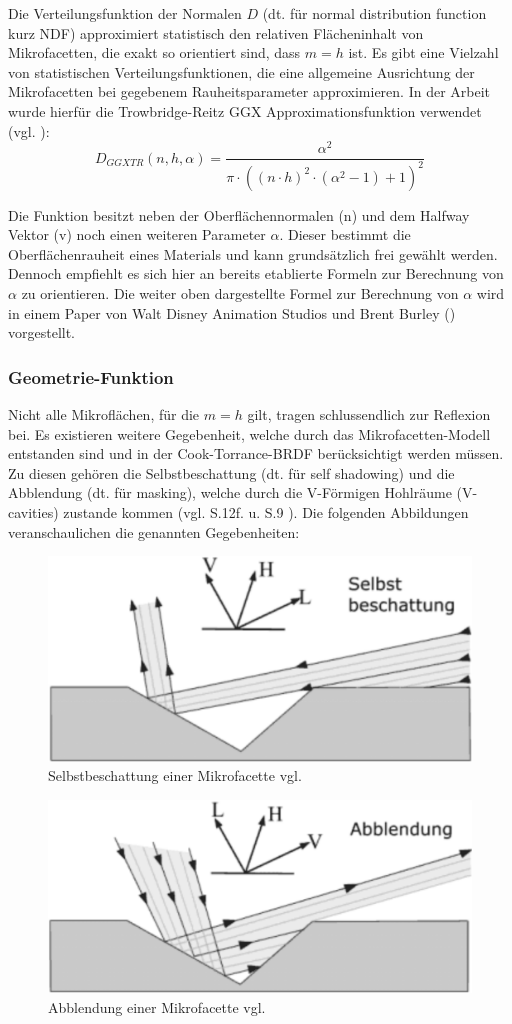 \documentclass[
  11pt,
  a4paper,
  oneside
  ]{article}
\begin{document}
Die Verteilungsfunktion der Normalen $D$ (dt. für normal distribution function kurz NDF) approximiert statistisch den relativen Flächeninhalt von Mikrofacetten, die exakt so orientiert sind, dass $m = h$ ist. Es gibt eine Vielzahl von statistischen Verteilungsfunktionen, die eine allgemeine Ausrichtung der Mikrofacetten bei gegebenem Rauheitsparameter approximieren. In der Arbeit wurde hierfür die Trowbridge-Reitz GGX Approximationsfunktion verwendet (vgl. \cite{learnOpenGL}):
\[D_{GGXTR}\left( n,h,\alpha \right) =\dfrac{\alpha ^{2}}{\pi \cdot \left( \left( n\cdot h\right) ^{2}\cdot \left( \alpha ^{2}-1\right) +1\right) ^{2}}\]

Die Funktion besitzt neben der Oberflächennormalen (n) und dem Halfway Vektor (v) noch einen weiteren Parameter $\alpha$. Dieser bestimmt die Oberflächenrauheit eines Materials und kann grundsätzlich frei gewählt werden. Dennoch empfiehlt es sich hier an bereits etablierte Formeln zur Berechnung von $\alpha$ zu orientieren. Die weiter oben dargestellte Formel zur Berechnung von $\alpha$ wird in einem Paper von Walt Disney Animation Studios und Brent Burley (\cite{Burley2012PhysicallyBasedSA}) vorgestellt.
\subsubsection{Geometrie-Funktion}
Nicht alle Mikroflächen, für die $m = h$ gilt, tragen schlussendlich zur Reflexion bei. Es existieren weitere Gegebenheit, welche durch das Mikrofacetten-Modell entstanden sind und in der Cook-Torrance-BRDF berücksichtigt werden müssen. Zu diesen gehören die Selbstbeschattung (dt. für self shadowing) und die Abblendung (dt. für masking), welche durch die V-Förmigen Hohlräume (V-cavities) zustande kommen 
(vgl. S.12f. \cite{rtrPaper} u. S.9 \cite{irrlichtOrg}). Die folgenden Abbildungen veranschaulichen die genannten Gegebenheiten: 
\begin{figure}[H]
  \centering
  \includegraphics*[width=0.45 \textwidth]{images/selstbeschattung.png}
  \caption{Selbstbeschattung einer Mikrofacette vgl. \cite{learnOpenGL}}
  \label{fig:img8}
\end{figure}
\begin{figure}[H]
  \centering
  \includegraphics*[width=0.45 \textwidth]{images/abblendung.png}
  \caption{Abblendung einer Mikrofacette vgl. \cite{learnOpenGL}}
  \label{fig:img9}
\end{figure}
\end{document}
